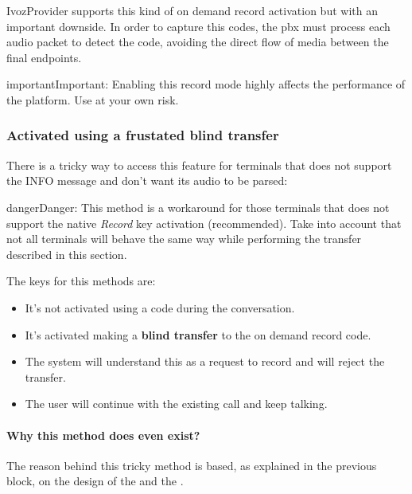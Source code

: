\documentclass[letterpaper,10pt,english]{sphinxmanual}
\begin{document}
IvozProvider supports this kind of on demand record activation but with an
important downside. In order to capture this codes, the pbx must process each
audio packet to detect the code, avoiding the direct flow of media between the
final endpoints.

\begin{notice}{important}{Important:}
Enabling this record mode highly affects the performance of the
platform. Use at your own risk.
\end{notice}


\subsubsection{Activated using a frustated blind transfer}
\label{pbx_features/call_recording:activated-using-a-frustated-blind-transfer}
There is a tricky way to access this feature for terminals that does not support
the INFO message and don't want its audio to be parsed:

\begin{notice}{danger}{Danger:}
This method is a workaround for those terminals that does not support
the native \emph{Record} key activation (recommended). Take into account that not
all terminals will behave the same way while performing the transfer described
in this section.
\end{notice}

The keys for this methods are:
\begin{itemize}
\item {} 
It's not activated using a code during the conversation.

\item {} 
It's activated making a \textbf{blind transfer} to the on demand record code.

\item {} 
The system will understand this as a request to record and will reject the transfer.

\item {} 
The user will continue with the existing call and keep talking.

\end{itemize}
\paragraph{Why this method does even exist?}

The reason behind this tricky method is based, as explained in the previous
block, on the design of the {\hyperref[architecture/index:architecture]{}} and the {\hyperref[architecture/index:audioflow]{}}.
\end{document}
